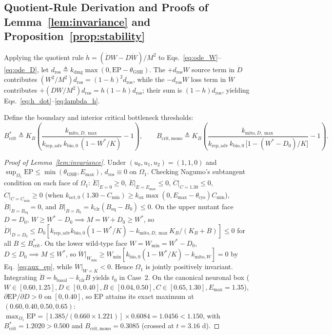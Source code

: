 \documentclass[11pt]{article}
\theoremstyle{plain}
\theoremstyle{remark}
\begin{document}
\subsection{Quotient-Rule Derivation and Proofs of Lemma~\ref{lem:invariance} and Proposition~\ref{prop:stability}}
\label{app:invariance}
Applying the quotient rule $\dot{h} = (\dot{D}W - D\dot{W})/M^2$ to Eqs.~\eqref{eq:ode_W}--\eqref{eq:ode_D}, let $d_{\mathrm{ros}} \triangleq k_{\mathrm{dmg}}\max(0, \mathrm{EP} - \theta_{\mathrm{GSH}})$. The $+d_{\mathrm{ros}}W$ source term in $\dot{D}$ contributes $(W^2/M^2)d_{\mathrm{ros}} = (1 - h)^2 d_{\mathrm{ros}}$, while the $-d_{\mathrm{ros}}W$ loss term in $\dot{W}$ contributes $+(DW/M^2)d_{\mathrm{ros}} = h(1 - h)d_{\mathrm{ros}}$; their sum is $(1 - h)d_{\mathrm{ros}}$, yielding Eqs.~\eqref{eq:h_dot}--\eqref{eq:lambda_h}.

Define the boundary and interior critical bottleneck thresholds:
\begin{equation}
  B_{\mathrm{crit}}^* \triangleq K_B\!\left(\frac{k_{\mathrm{mito},D,\max}}{k_{\mathrm{rep,adv}}\,k_{\mathrm{bio},0}\,(1 - W^*/K)} - 1\right), \qquad
  B_{\mathrm{crit,mono}} \triangleq K_B\!\left(\frac{k_{\mathrm{mito},D,\max}}{k_{\mathrm{rep,adv}}\,k_{\mathrm{bio},0}\,\big[1 - (W^* - D_0)/K\big]} - 1\right).
  \label{eq:B_crit}
\end{equation}
\begin{proof}[Proof of Lemma~\ref{lem:invariance}]
Under $(u_0, u_1, u_2) = (1, 1, 0)$ and $\sup_{\Omega_1}\mathrm{EP} \le \min(\theta_{\mathrm{GSH}}, E_{\max})$, $d_{\mathrm{ros}} \equiv 0$ on $\Omega_1$. Checking Nagumo's subtangent condition on each face of $\Omega_1$: $\dot{E}|_{E=0} \ge 0$, $\dot{E}|_{E=E_{\max}} \le 0$, $\dot{C}|_{C=1.30} \le 0$, $\dot{C}|_{C=C_{\min}} \ge 0$ (when $k_{\mathrm{oct},0}(1.30 - C_{\min}) \ge k_{\mathrm{ox}}\max(0, E_{\max} - \theta_{\mathrm{cys}})C_{\min}$), $\dot{B}|_{B=B_{\mathrm{eq}}} = 0$, and $\dot{B}|_{B=B_0} = k_{\mathrm{clr}}(B_{\mathrm{eq}} - B_0) \le 0$. On the upper mutant face $D = D_0$, $W \ge W^* - D_0 \implies M = W + D_0 \ge W^*$, so $\dot{D}|_{D=D_0} \le D_0[k_{\mathrm{rep,adv}}k_{\mathrm{bio},0}(1 - W^*/K) - k_{\mathrm{mito},D,\max}K_B/(K_B + B)] \le 0$ for all $B \le B_{\mathrm{crit}}^*$. On the lower wild-type face $W = W_{\min} = W^* - D_0$, $D \le D_0 \implies M \le W^*$, so $\dot{W}|_{W_{\min}} \ge W_{\min}[k_{\mathrm{bio},0}(1 - W^*/K) - k_{\mathrm{mito},W}] = 0$ by Eq.~\eqref{eq:aux_ep}, while $\dot{W}|_{W=K} < 0$. Hence $\Omega_1$ is jointly positively invariant. Integrating $\dot{B} = b_{\mathrm{basal}} - k_{\mathrm{clr}}B$ yields $t_0$ in Case~2. On the canonical neuronal box ($W \in [0.60, 1.25], D \in [0, 0.40], B \in [0.04, 0.50], C \in [0.65, 1.30], E_{\max} = 1.35$), $\partial\mathrm{EP}/\partial D > 0$ on $[0, 0.40]$, so $\mathrm{EP}$ attains its exact maximum at $(0.60, 0.40, 0.50, 0.65)$: $\max_{\Omega_1}\mathrm{EP} = [1.385 / (0.660 \times 1.221)] \times 0.6084 = 1.0456 < 1.150$, with $B_{\mathrm{crit}}^* = 1.2020 > 0.500$ and $B_{\mathrm{crit,mono}} = 0.3085$ (crossed at $t = 3.16\text{ d}$).
\end{proof}
\end{document}
